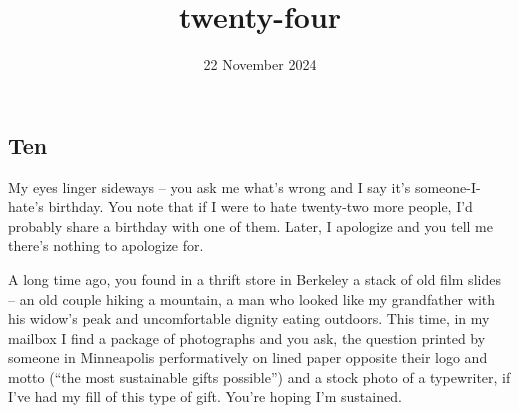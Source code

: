 \documentclass[11pt]{article}
\title{twenty-four}
\date{22 November 2024}
\begin{document}
    \maketitle
    \subsection*{Ten}
    My eyes linger sideways -- you ask me what's wrong and I say it's someone-I-hate's birthday. You note that if I were to hate twenty-two more people, I'd probably share a birthday with one of them. Later, I apologize and you tell me there's nothing to apologize for. 

    A long time ago, you found in a thrift store in Berkeley a stack of old film slides -- an old couple hiking a mountain, a man who looked like my grandfather with his widow's peak and uncomfortable dignity eating outdoors. This time, in my mailbox I find a package of photographs and you ask, the question printed by someone in Minneapolis performatively on lined paper opposite their logo and motto (``the most sustainable gifts possible'') and a stock photo of a typewriter, if I've had my fill of this type of gift. You're hoping I'm sustained.
    
    \newpage
    \printbibliography[title={Bibliography}]
\end{document}

